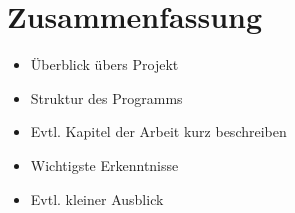 
\chapter{Zusammenfassung}


\begin{itemize}
\item Überblick übers Projekt
\item Struktur des Programms
\item Evtl. Kapitel der Arbeit kurz beschreiben
\item Wichtigste Erkenntnisse
\item Evtl. kleiner Ausblick
\end{itemize}